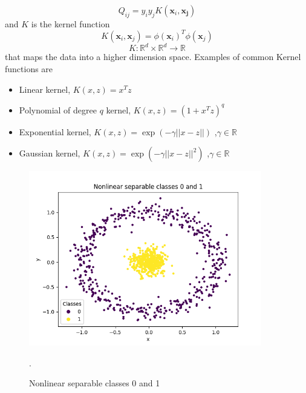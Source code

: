 \documentclass[../Main/thesis.tex]{subfiles}
\begin{document}
\begin{equation}\label{eq:Q}
	Q_{ij} = y_{i}y_{j}K(\bm{x}_{i},\bm{x_{j}})
\end{equation}
and $K$ is the kernel function 
\begin{equation}
	K(\bm{x}_{i},\bm{x}_{j}) = \phi(\bm{x}_{i})^{T}\phi(\bm{x}_{j})
\end{equation}
\begin{equation}
K: \mathbb{R}^{d}\times \mathbb{R}^{d} \rightarrow \mathbb{R}
\end{equation}
that  maps the data into a higher dimension space. Examples of common Kernel functions are 
\begin{itemize}
	\item Linear kernel,  $K\left(x,z\right) = x^{T}z$
	\item Polynomial of degree $q$ kernel, $K\left(x,z\right) = \left(1+x^{T}z\right)^{q}$ 
	\item Exponential kernel,  $K(x,z) = \exp\left(-\gamma ||x-z||\right)$ ,$\gamma\in\mathbb{R}$
	\item Gaussian kernel,  $K(x,z) = \exp\left(-\gamma ||x-z||^{2}\right)$ ,$\gamma\in\mathbb{R}$
\end{itemize}

\begin{figure}[H] %
   \centering
   \includegraphics[width=4in]{../fig/nonlinearseparable.png} 
   \caption{Nonlinear separable classes 0 and 1}.
   \label{fig:kernelsvm}
\end{figure}
\end{document}
